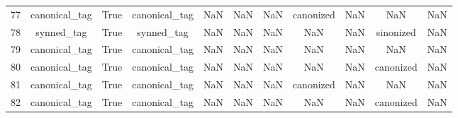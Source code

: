 \begin{table}[h!]
{\begin{tabular}{|c|c|c|c|c|c|c|c|c|c|c|}
         77 &             canonical\_tag &                              True &                canonical\_tag &                                  NaN &                                  NaN &                                  NaN &                            canonized &                                  NaN &                                  NaN &                                                NaN \\
         78 &                synned\_tag &                              True &                   synned\_tag &                                  NaN &                                  NaN &                                  NaN &                                  NaN &                                  NaN &                            sinonized &                                                NaN \\
         79 &             canonical\_tag &                              True &                canonical\_tag &                                  NaN &                                  NaN &                                  NaN &                                  NaN &                                  NaN &                                  NaN &                                                NaN \\
         80 &             canonical\_tag &                              True &                canonical\_tag &                                  NaN &                                  NaN &                                  NaN &                                  NaN &                                  NaN &                            canonized &                                                NaN \\
         81 &             canonical\_tag &                              True &                canonical\_tag &                                  NaN &                                  NaN &                                  NaN &                            canonized &                                  NaN &                                  NaN &                                                NaN \\
         82 &             canonical\_tag &                              True &                canonical\_tag &                                  NaN &                                  NaN &                                  NaN &                                  NaN &                                  NaN &                            canonized &                                                NaN \\

\end{tabular}}
\end{table}
